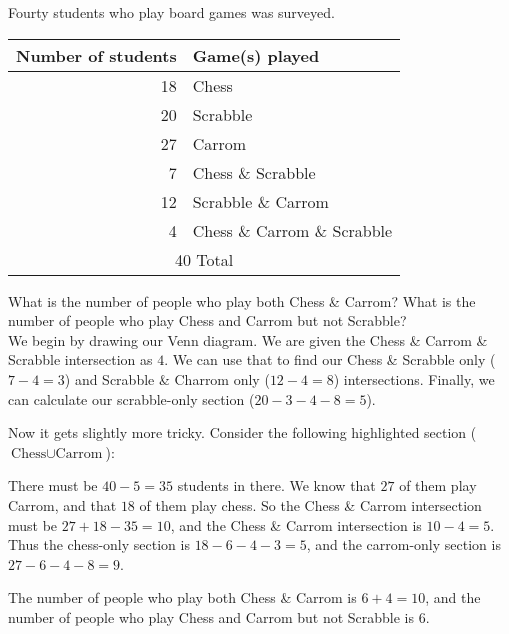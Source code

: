 \begin{boxexample}{}{}
	Fourty students who play board games was surveyed.

	\begin{tabular}{r|l}
		\hline
		Number of students & Game(s) played\\
		\hline
		18 & Chess\\
		20 & Scrabble\\
		27 & Carrom\\
		7  & Chess \& Scrabble\\
		12 & Scrabble \& Carrom\\
		4  & Chess \& Carrom \& Scrabble\\
		\hline
		\multicolumn{2}{c}{40 Total}\\
		\hline
	\end{tabular}

	What is the number of people who play both Chess \& Carrom? What is the number of people who play Chess and Carrom but not Scrabble?\\

	We begin by drawing our Venn diagram. We are given the Chess \& Carrom \& Scrabble intersection as $4$. We can use that to find our Chess \& Scrabble only ($7-4=3$) and Scrabble \& Charrom only ($12-4=8$) intersections. Finally, we can calculate our scrabble-only section ($20-3-4-8=5$).

	\begin{venndiagram3sets}[shade=skyblue,showframe=false,labelA={Chess},labelB={Scrabble},labelC={Carrom},labelABC={4},labelOnlyAB={3},labelOnlyBC={8},labelOnlyB={5}]
	\end{venndiagram3sets}

	Now it gets slightly more tricky. Consider the following highlighted section ($\text{Chess} \cup \text{Carrom}$):

	\begin{venndiagram3sets}[shade=skyblue,showframe=false,labelA={Chess},labelB={Scrabble},labelC={Carrom},labelABC={4},labelOnlyAB={3},labelOnlyBC={8},labelOnlyB={5}]
		\fillA \fillC
	\end{venndiagram3sets}

	There must be $40-5=35$ students in there. We know that $27$ of them play Carrom, and that $18$ of them play chess. So the Chess \& Carrom intersection must be $27+18-35=10$, and the Chess \& Carrom intersection is $10-4=5$. Thus the chess-only section is $18-6-4-3=5$, and the carrom-only section is $27-6-4-8=9$.

	\begin{venndiagram3sets}[shade=skyblue,showframe=false,labelA={Chess},labelB={Scrabble},labelC={Carrom},labelABC={4},labelOnlyAB={3},labelOnlyBC={8},labelOnlyB={5},labelOnlyAC={6},labelOnlyA={5},labelOnlyC={9}]
	\end{venndiagram3sets}

	The number of people who play both Chess \& Carrom is $6+4=10$, and the number of people who play Chess and Carrom but not Scrabble is $6$.
\end{boxexample}
